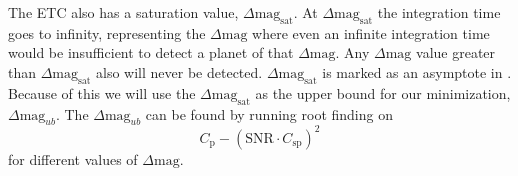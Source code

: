 The ETC also has a saturation value, $\Delta\textrm{mag}_\textrm{sat}$. At
$\Delta\textrm{mag}_\textrm{sat}$ the integration time goes to infinity,
representing the $\Delta\textrm{mag}$ where even an infinite integration time
would be insufficient to detect a planet of that $\Delta\textrm{mag}$. Any
$\Delta\textrm{mag}$ value greater than $\Delta\textrm{mag}_\textrm{sat}$ also
will never be detected. $\Delta\textrm{mag}_\textrm{sat}$ is marked as an
asymptote in . Because of this we will use the
$\Delta\textrm{mag}_\textrm{sat}$ as the upper bound for our minimization,
$\Delta\textrm{mag}_{ub}$. The $\Delta\textrm{mag}_{ub}$ can be found by
running root finding on 
\begin{equation}
  C_{\textrm{p}} - \left(\textrm{SNR} \cdot C_{\textrm{sp}}\right)^2
  \label{eq:sat_root}
\end{equation}
for different values of $\Delta\textrm{mag}$.

